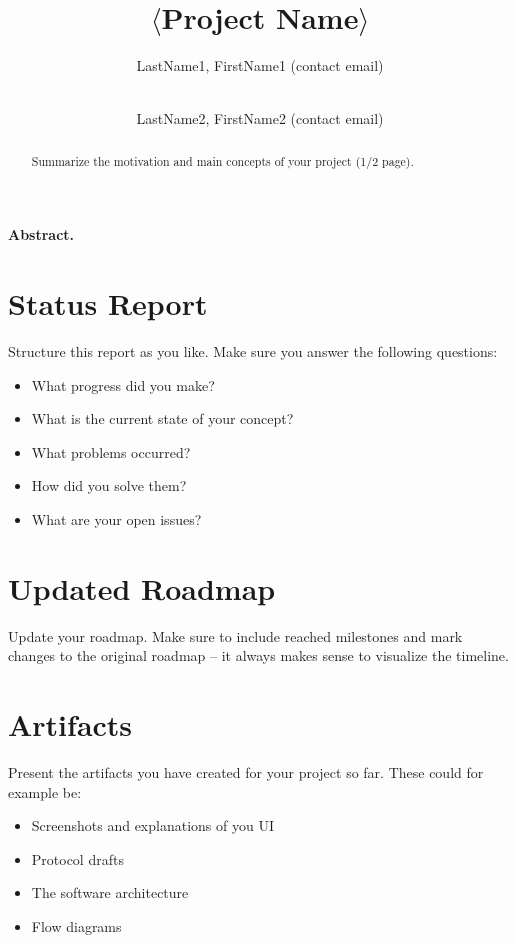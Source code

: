 \documentclass{scrarticle}
\begin{document}
\title{$\langle$Project Name$\rangle$} %
\author{%
	LastName1, FirstName1 (contact email) 
	\and \\
	LastName2, FirstName2 (contact email)
}

\clearpage

\paragraph{Abstract.}
\begin{abstract}
	Summarize the motivation and main concepts of your project (1/2 page). 
\end{abstract}

\newpage
\section{Status Report}
Structure this report as you like. Make sure you answer the following questions: 
\begin{itemize}
	\item What progress did you make?
	\item What is the current state of your concept?
	\item What problems occurred?
	\item How did you solve them?
	\item What are your open issues?
\end{itemize}

\newpage
\section{Updated Roadmap}
Update your roadmap. Make sure to include reached milestones and mark changes to the original roadmap -- it always makes sense to visualize the timeline.

\section{Artifacts}
Present the artifacts you have created for your project so far. These could for example be:
\begin{itemize}
	\item Screenshots and explanations of you UI
	\item Protocol drafts
	\item The software architecture
	\item Flow diagrams	
\end{itemize}

\newpage


\end{document}
